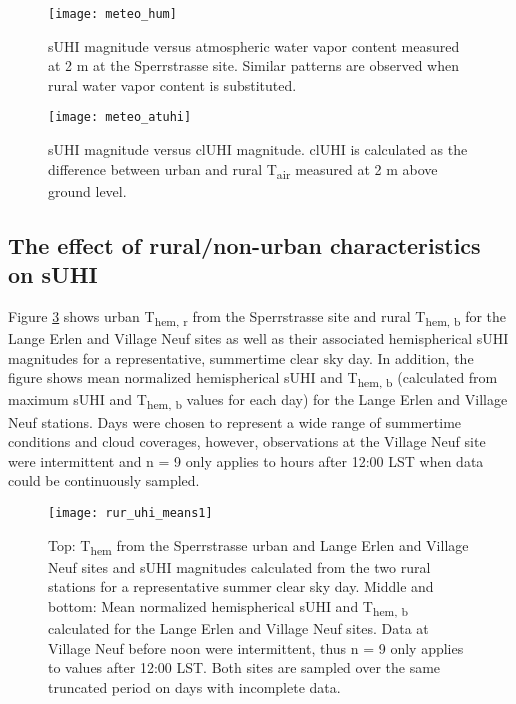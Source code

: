 \begin{bibunit}
\begin{figure}[H]
	\centering
	\texttt{[image: meteo\_hum]}
	\caption{sUHI magnitude versus atmospheric water vapor content measured at 2 \si{\meter} at the Sperrstrasse site. Similar patterns are observed when rural water vapor content is substituted.}
	\label{meteo_hum}
\end{figure}

\begin{figure}[H]
	\centering
	\texttt{[image: meteo\_atuhi]}
	\caption{sUHI magnitude versus clUHI magnitude. clUHI is calculated as the difference between urban and rural T\textsubscript{air} measured at 2 \si{\meter} above ground level.}
	\label{meteo_atuhi}
\end{figure}

\pagebreak

\subsection{The effect of rural/non-urban characteristics on sUHI}

Figure \ref{rur_uhi_means} shows urban T\textsubscript{hem, r} from the Sperrstrasse site and rural T\textsubscript{hem, b} for the Lange Erlen and Village Neuf sites as well as their associated hemispherical sUHI magnitudes for a representative, summertime clear sky day. In addition, the figure shows mean normalized hemispherical sUHI and T\textsubscript{hem, b} (calculated from maximum sUHI and T\textsubscript{hem, b} values for each day) for the Lange Erlen and Village Neuf stations. Days were chosen to represent a wide range of summertime conditions and cloud coverages, however, observations at the Village Neuf site were intermittent and n = 9 only applies to hours after 12:00 LST when data could be continuously sampled.

\begin{figure}[H]
	\centering
	\texttt{[image: rur\_uhi\_means1]}
	\caption{Top: T\textsubscript{hem} from the Sperrstrasse urban and Lange Erlen and Village Neuf sites and sUHI magnitudes calculated from the two rural stations for a representative summer clear sky day. Middle and bottom: Mean normalized hemispherical sUHI and T\textsubscript{hem, b} calculated for the Lange Erlen and Village Neuf sites. Data at Village Neuf before noon were intermittent, thus n = 9 only applies to values after 12:00 LST. Both sites are sampled over the same truncated period on days with incomplete data.}
	\label{rur_uhi_means}
\end{figure}


\end{bibunit}

